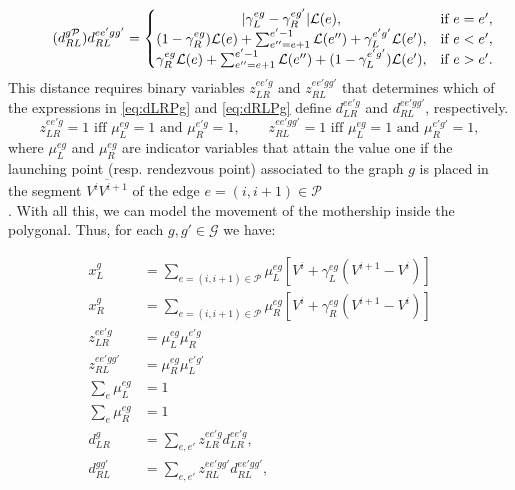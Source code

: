 \begin{equation}\tag{$d_{RL}^{g\mathcal P}$}\label{eq:dRLPg}
d_{RL}^{ee'gg'} = \left\{\begin{matrix}
|\gamma_{L}^{eg} - \gamma_{R}^{eg'}|\mathcal L(e), & \text{if } e = e',\\
(1 - \gamma_{R}^{eg})\mathcal L(e) + \sum_{e'' = e+1}^{e'-1}\mathcal L(e'') + \gamma_{L}^{e'g'}\mathcal L(e'), & \text{if } e < e',\\
\gamma_{R}^{eg}\mathcal L(e) + \sum_{e'' = e+1}^{e'-1}\mathcal L(e'') + (1-\gamma_{L}^{e'g'})\mathcal L(e'), & \text{if } e > e'.
\end{matrix}\right.
\end{equation}
\noindent
This distance requires binary variables $z_{LR}^{ee'g}$ and $z_{RL}^{ee'gg'}$ that determines which of the expressions in \eqref{eq:dLRPg} and  \eqref{eq:dRLPg} define $d_{LR}^{ee'g}$ and $d_{RL}^{ee'gg'}$, respectively.
$$z_{LR}^{ee'g} = 1 \text{ iff } \mu_{L}^{eg} = 1 \text{ and }\mu_{R}^{e'g} = 1,\qquad
z_{RL}^{ee'gg'} = 1 \text{ iff } \mu_{L}^{eg} = 1 \text{ and }\mu_{R}^{e'g'} = 1,
$$
where $\mu_{L}^{eg}$ and $\mu_{R}^{eg}$ are indicator variables that attain the value one if the launching point (resp. rendezvous point) associated to the graph $g$ is placed in the segment $\overline{V^iV^{i+1}}$ of the edge $e=(i, i+1) \in \mathcal P$\\.
\noindent
With all this, we can model the movement of the mothership inside the polygonal. Thus, for each $g, g'\in\mathcal G$ we have:

\begin{align}
    x_L^g & = \sum_{e=(i, i+1)\in\mathcal P} \mu_{L}^{eg}\left[V^i + \gamma_L^{eg}(V^{i+1} - V^i)\right]\label{param1g}\\
    x_R^g & = \sum_{e=(i, i+1)\in\mathcal P} \mu_{R}^{eg}\left[ V^i + \gamma_R^{eg}(V^{i+1} - V^i)\right]\label{param2g}\\
    z_{LR}^{ee'g} & = \mu_{L}^{eg}\mu_{R}^{e'g}\label{prodLRg}\\
    z_{RL}^{ee'gg'} & = \mu_{R}^{eg}\mu_{L}^{e'g'}\label{prodRLg}\\
    \sum_{e} \mu_{L}^{eg} & = 1  \label{muLg} \\
    \sum_{e} \mu_{R}^{eg} & = 1 \label{muRg}\\
    d_{LR}^{g} & = \sum_{e, e'} z_{LR}^{ee'g} d_{LR}^{ee'g} \label{dLRg},\\
    d_{RL}^{gg'} & = \sum_{e, e'} z_{RL}^{ee'gg'} d_{RL}^{ee'gg'} \label{dRLgg},
\end{align}

